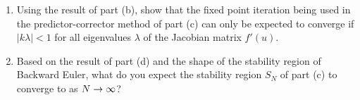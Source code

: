 \begin{enumerate}
\item Using the result of part (b), show that the fixed point iteration
being used in the predictor-corrector method of part (c) can only be
expected to converge if $|k\lambda| < 1$ for all eigenvalues $\lambda$ of the
Jacobian matrix $f'(u)$.  

\item Based on the result of part (d) and the shape of the stability region
of Backward Euler, what do you expect the stability region $S_N$ of part (c)
to converge to as $N\rightarrow\infty$?

\end{enumerate}




